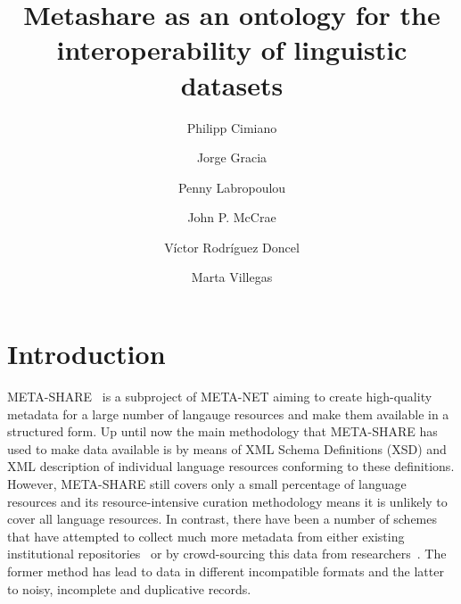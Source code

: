 \documentclass{llncs}
\begin{document}
\title{Metashare as an ontology for the interoperability of linguistic datasets}

%
%

\author{Philipp Cimiano \and Jorge Gracia \and Penny Labropoulou \and John P. McCrae \and V\'ictor Rodr\'iguez Doncel \and Marta Villegas}
%
%
%
    
\maketitle              %

\begin{abstract}
\end{abstract}

\section{Introduction}
\label{sec:introduction}

META-SHARE~\cite{piperidis2012meta} is a subproject of META-NET aiming to create high-quality metadata
for a large number of langauge resources and make them available in a structured
form. Up until now the main methodology that META-SHARE has used to make data
available is by means of XML Schema Definitions (XSD) and XML description of
individual language resources conforming to these definitions. However,
META-SHARE still covers only a small percentage of language resources and its
resource-intensive curation methodology means it is unlikely to cover all
language resources. In contrast, there have been a number of schemes that have
attempted to collect much more metadata from either existing institutional
repositories~\cite[CLARIN]{broeder2010data} or by crowd-sourcing this data from
researchers~\cite[LRE-Map]{calzolari2012lre}. The former method has lead to
data in different incompatible formats and the latter to noisy, incomplete and
duplicative records.
\end{document}
